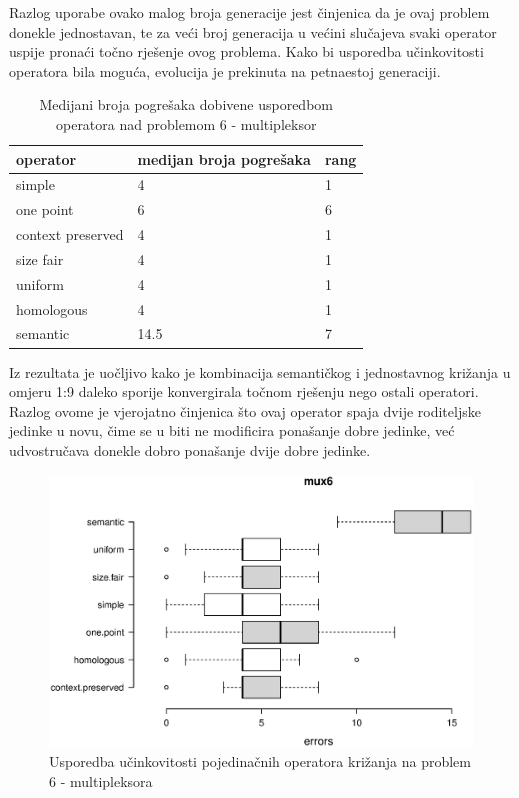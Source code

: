 Razlog uporabe ovako malog broja generacije jest činjenica da je ovaj problem donekle jednostavan, te za veći broj generacija u većini slučajeva svaki operator uspije pronaći točno rješenje ovog problema. Kako bi usporedba učinkovitosti operatora bila moguća, evolucija je prekinuta na petnaestoj generaciji.

\begin{table}[H]
 	\centering
\caption{Medijani broja pogrešaka dobivene usporedbom operatora nad problemom 6 - multipleksor}
    \begin{tabular}{| l | l | l |}
    \hline
    \textbf{operator}  & \textbf{medijan broja pogrešaka} & \textbf{rang}\\ \hline
    simple & 4 & 1\\ \hline
    one point & 6 & 6\\ \hline
    context preserved & 4 & 1\\ \hline
    size fair & 4 & 1\\ \hline
    uniform & 4 & 1\\ \hline
    homologous & 4 & 1\\ \hline
    semantic & 14.5 & 7\\ \hline
    \end{tabular}
    
    
    \label{mux6table}
\end{table}

Iz rezultata je uočljivo kako je kombinacija semantičkog i jednostavnog križanja u omjeru 1:9 daleko sporije konvergirala točnom rješenju nego ostali operatori. Razlog ovome je vjerojatno činjenica što ovaj operator spaja dvije roditeljske jedinke u novu, čime se u biti ne modificira ponašanje dobre jedinke, već udvostručava donekle dobro ponašanje dvije dobre jedinke.

\begin{figure}[H]
	\centering
	\includegraphics[trim=0cm 4cm 0cm 0cm, scale=0.6]{./slike/boxPlots/mux6.eps}
	\caption{Usporedba učinkovitosti pojedinačnih operatora križanja na problem 6 - multipleksora}
	\label{muxbox}
\end{figure}


